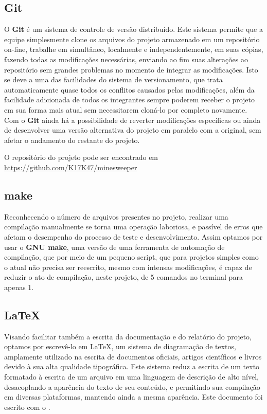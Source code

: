\documentclass[10pt,a4paper]{report}
\begin{document}
\subsection{Git}
O \textbf{Git} é um sistema de controle de versão distribuído. Este sistema permite que a equipe simplesmente clone os arquivos do projeto armazenado em um repositório on-line, trabalhe em simultâneo, localmente e independentemente, em suas cópias, fazendo todas as modificações necessárias, enviando ao fim suas alterações ao repositório sem grandes problemas no momento de integrar as modificações. Isto se deve a uma das facilidades do sistema de versionamento, que trata automaticamente quase todos os conflitos causados pelas modificações, além da facilidade adicionada de todos os integrantes sempre poderem receber o projeto em sua forma mais atual sem necessitarem cloná-lo por completo novamente. Com o \textbf{Git} ainda há a possibilidade de reverter modificações específicas ou ainda de desenvolver uma versão alternativa do projeto em paralelo com a original, sem afetar o andamento do restante do projeto.

O repositório do projeto pode ser encontrado em \url{https://github.com/K17K47/minesweeper}

\subsection{make}
Reconhecendo o número de arquivos presentes no projeto, realizar uma compilação manualmente se torna uma operação laboriosa, e passível de erros que afetam o desempenho do processo de teste e desenvolvimento. Assim optamos por usar o \textbf{GNU make}, uma versão de uma ferramenta de automação de compilação, que por meio de um pequeno script, que para projetos simples como o atual não precisa ser reescrito, mesmo com intensas modificações, é capaz de reduzir o ato de compilação, neste projeto, de 5 comandos no terminal para apenas 1.

\subsection{\LaTeX}
Visando facilitar também a escrita da documentação e do relatório do projeto, optamos por escrevê-lo em \LaTeX, um sistema de diagramação de textos, amplamente utilizado na escrita de documentos oficiais, artigos científicos e livros devido à sua alta qualidade tipográfica. Este sistema reduz a escrita de um texto formatado à escrita de um arquivo em uma linguagem de descrição de alto nível, desacoplando a aparência do texto de seu conteúdo, e permitindo sua compilação em diversas plataformas, mantendo ainda a mesma aparência. Este documento foi escrito com o \LaTeXe.
\end{document}
